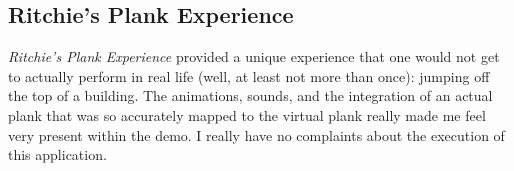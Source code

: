 \documentclass[11pt]{article}
\begin{document}
\subsection{Ritchie's Plank Experience}
\textit{Ritchie's Plank Experience} provided a unique experience that one would not get to
actually perform in real life (well, at least not more than once): jumping off the top of
a building. The animations, sounds, and the integration of an actual plank that was so
accurately mapped to the virtual plank really made me feel very present within the demo.
I really have no complaints about the execution of this application.
\end{document}

